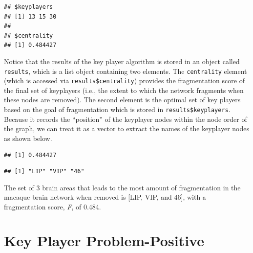 \documentclass[
]{book}
\newenvironment{Shaded}{\begin{snugshade}}{\end{snugshade}}
\newcommand{\CommentTok}[1]{\textcolor[rgb]{0.56,0.35,0.01}{\textit{#1}}}
\newcommand{\FunctionTok}[1]{\textcolor[rgb]{0.13,0.29,0.53}{\textbf{#1}}}
\newcommand{\NormalTok}[1]{#1}
\newcommand{\SpecialCharTok}[1]{\textcolor[rgb]{0.81,0.36,0.00}{\textbf{#1}}}
\begin{document}
\begin{verbatim}
## $keyplayers
## [1] 13 15 30
## 
## $centrality
## [1] 0.484427
\end{verbatim}

Notice that the results of the key player algorithm is stored in an object called \texttt{results}, which is a list object containing two elements. The \texttt{centrality} element (which is accessed via \texttt{results\$centrality}) provides the fragmentation score of the final set of keyplayers (i.e., the extent to which the network fragments when these nodes are removed). The second element is the optimal set of key players based on the goal of fragmentation which is stored in \texttt{results\$keyplayers}. Because it records the ``position'' of the keyplayer nodes within the node order of the graph, we can treat it as a vector to extract the names of the keyplayer nodes as shown below.

\begin{Shaded}
\end{Shaded}

\begin{verbatim}
## [1] 0.484427
\end{verbatim}

\begin{Shaded}
\end{Shaded}

\begin{verbatim}
## [1] "LIP" "VIP" "46"
\end{verbatim}

The set of 3 brain areas that leads to the most amount of fragmentation in the macaque brain network when removed is {[}LIP, VIP, and 46{]}, with a fragmentation score, \emph{F}, of 0.484.

\section{Key Player Problem-Positive}\label{key-player-problem-positive}
\end{document}

